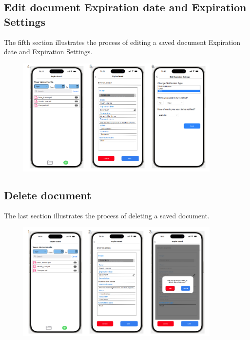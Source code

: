 	\subsection{Edit document Expiration date and Expiration Settings}
		The fifth section illustrates the process of editing a saved document Expiration date and Expiration Settings.
		\begin{figure}[htbp]
			\centering
			\includegraphics[width=0.9\textwidth]{../mockups/edit_doc_expr_1.png}  %
		\end{figure}
		\clearpage
	\subsection{Delete document}
		The last section illustrates the process of deleting a saved document.
		\begin{figure}[htbp]
			\centering
			\includegraphics[width=0.9\textwidth]{../mockups/delete_doc.png}  %
		\end{figure}
		\clearpage
		
